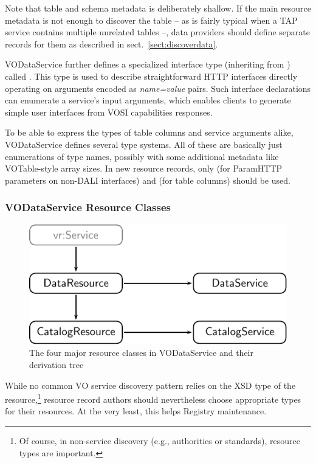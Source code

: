 \documentclass[11pt,a4paper]{ivoa}
\begin{document}
Note that table and schema metadata is deliberately shallow.  If the
main resource metadata is not enough to discover the table -- as is
fairly typical when a TAP service contains multiple unrelated tables --,
data providers should define separate records for them as described in
sect.~\ref{sect:discoverdata}.

VODataService further defines a specialized interface type
(inheriting from ) called
.  This type is used to describe
straightforward HTTP interfaces directly operating on
arguments encoded as
\emph{name=value} pairs.  Such interface declarations can
enumerate a service's input arguments, which enables clients
to generate simple
user interfaces from VOSI capabilities responses.

To be able to express the types of table columns and service arguments
alike, VODataService defines several type systems.  All of these are
basically just enumerations of type names, possibly with some additional
metadata like VOTable-style array sizes.  In new resource records, only
 (for ParamHTTP parameters on non-DALI
interfaces) and
 (for table columns) should be used.

\subsubsection{VODataService Resource Classes}

\begin{figure}
\includegraphics{resclasses.pdf}
\caption{The four major resource classes in VODataService and their
derivation tree}
\label{fig:rescls}
\end{figure}

While no common VO service discovery pattern relies on the XSD type  of the
resource,\footnote{Of course, in non-service discovery (e.g., authorities
or standards), resource types are important.} resource
record authors should
nevertheless choose appropriate types for their resources.  At the
very least, this helps Registry maintenance.
\end{document}
